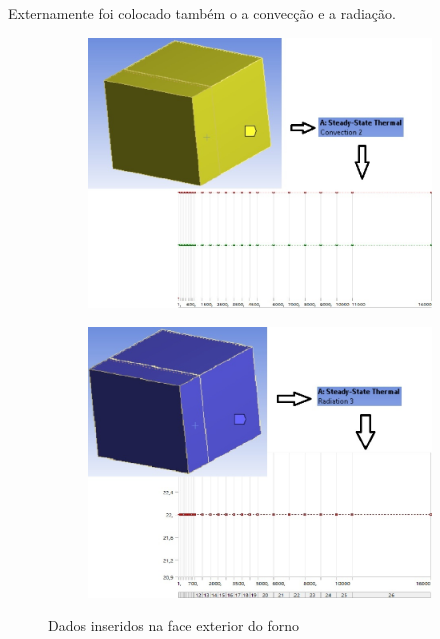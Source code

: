 Externamente foi colocado também o a convecção e a radiação.
\begin{figure}[H]
\centering
    \begin{subfigure}{0.49\linewidth} \centering
        \includegraphics[scale=0.5]{figuras/ansys8.jpg}
        \label{ansys8}
    \end{subfigure}
    \begin{subfigure}{0.49\linewidth} \centering
        \includegraphics[scale=0.5]{figuras/ansys9.jpg}
        \label{ansys9}
    \end{subfigure}
    \caption{Dados inseridos na face exterior do forno}
\end{figure}

